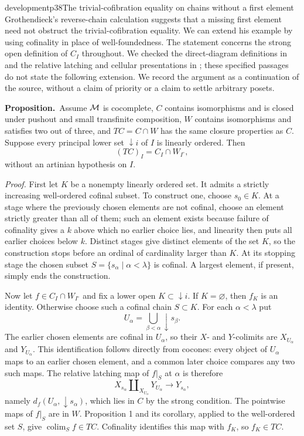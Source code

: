 \begin{dcomment}{development}{p38}{The trivial-cofibration equality on chains without a first element}
Grothendieck's reverse-chain calculation suggests that a missing first element need not obstruct the trivial-cofibration equality. We can extend his example by using cofinality in place of well-foundedness. The statement concerns the strong open definition of $C_I$ throughout. We checked the direct-diagram definitions in \citet[Sections 9.1--9.2]{RadulescuBanu2009} and the relative latching and cellular presentations in \citet[Definition 4.14 and Proposition 6.3]{RiehlVerity2014Reedy}; these specified passages do not state the following extension. We record the argument as a continuation of the source, without a claim of priority or a claim to settle arbitrary posets.

\textbf{Proposition.}\ours\ Assume $\mathcal{M}$ is cocomplete, $C$ contains isomorphisms and is closed under pushout and small transfinite composition, $W$ contains isomorphisms and satisfies two out of three, and $TC=C\cap W$ has the same closure properties as $C$. Suppose every principal lower set $\downarrow i$ of $I$ is linearly ordered. Then
\[
 (TC)_I=C_I\cap W_{I^\circ},
\]
without an artinian hypothesis on $I$.

\emph{Proof.} First let $K$ be a nonempty linearly ordered set. It admits a strictly increasing well-ordered cofinal subset. To construct one, choose $s_0\in K$. At a stage where the previously chosen elements are not cofinal, choose an element strictly greater than all of them; such an element exists because failure of cofinality gives a $k$ above which no earlier choice lies, and linearity then puts all earlier choices below $k$. Distinct stages give distinct elements of the set $K$, so the construction stops before an ordinal of cardinality larger than $K$. At its stopping stage the chosen subset $S=\{s_\alpha\mid\alpha<\lambda\}$ is cofinal. A largest element, if present, simply ends the construction.

Now let $f\in C_I\cap W_{I^\circ}$ and fix a lower open $K\subset\downarrow i$. If $K=\varnothing$, then $f_K$ is an identity. Otherwise choose such a cofinal chain $S\subset K$. For each $\alpha<\lambda$ put
\[
 U_\alpha=\bigcup_{\beta<\alpha}\downarrow s_\beta.
\]
The earlier chosen elements are cofinal in $U_\alpha$, so their $X$- and $Y$-colimits are $X_{U_\alpha}$ and $Y_{U_\alpha}$. This identification follows directly from cocones: every object of $U_\alpha$ maps to an earlier chosen element, and a common later choice compares any two such maps. The relative latching map of $f|_S$ at $\alpha$ is therefore
\[
 X_{s_\alpha}\amalg_{X_{U_\alpha}}Y_{U_\alpha}
       \longrightarrow Y_{s_\alpha},
\]
namely $d_f(U_\alpha,\downarrow s_\alpha)$, which lies in $C$ by the strong condition. The pointwise maps of $f|_S$ are in $W$. Proposition 1 and its corollary, applied to the well-ordered set $S$, give $\operatorname{colim}_S f\in TC$. Cofinality identifies this map with $f_K$, so $f_K\in TC$.


\end{dcomment}
